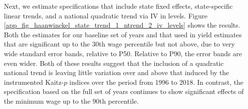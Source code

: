 \clearpage


Next, we estimate specifications that include state fixed effects, state-specific linear trends, and a national quadratic trend via IV in levels. %
Figure \ref{app_fig_haanwinckel_state_trend_1_ntrend_2_iv_levels} shows the results. Both the estimates for our baseline set of years and that used in  yield estimates that are significant up to the 30th wage percentile but not above, due to very wide standard error bands, relative to P50. Relative to P90, the error bands are even wider. Both of these results suggest that the inclusion of a quadratic national trend is leaving little variation over and above that induced by the instrumented Kaitz-$p$ indices over the period from 1996 to 2018. In contrast, the specification based on the full set of years continues to show significant effects of the minimum wage up to the 90th percentile.


